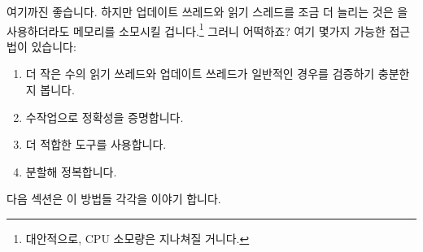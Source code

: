 여기까진 좋습니다.
하지만 업데이트 쓰레드와 읽기 스레드를 조금 더 늘리는 것은  을
사용하더라도 메모리를 소모시킬 겁니다.\footnote{
	대안적으로, CPU 소모량은 지나쳐질 거니다.}
그러니 어떡하죠?
여기 몇가지 가능한 접근법이 있습니다:

\iffalse

For reference, Table~\ref{tab:formal:promela:QRCU Spin Result Summary}
summarizes the Spin results with \co{-DCOLLAPSE} and \co{-DMA=N}
compiler flags.
The memory usage is obtained with minimal sufficient
search depths and \co{-DMA=N} parameters shown in the table.
Hashtable sizes for \co{-DCOLLAPSE} runs are tweaked by
the \co{-wN} option of \co{./pan} to avoid using too much
memory hashing small state spaces.
Hence the memory usage is smaller than what is shown in
Table~\ref{tab:advsync:Memory Usage of QRCU Model}, where the
hashtable size starts from the default of \co{-w24}.
The runtime is from a \Power{9} server, which shows that \co{-DMA=N}
suffers up to about an order of magnitude higher CPU overhead
than does \co{-DCOLLAPSE}, but on the other hand reduces memory overhead
by well over an order of magnitude.

So far so good.
But adding a few more updaters or readers would exhaust memory, even
with \co{-DMA=N}.\footnote{
	Alternatively, the CPU consumption would become excessive.}
So what to do?
Here are some possible approaches:

\fi

\begin{enumerate}
\item	더 작은 수의 읽기 쓰레드와 업데이트 쓰레드가 일반적인 경우를 검증하기
	충분한지 봅니다.
\item	수작업으로 정확성을 증명합니다.
\item	더 적합한 도구를 사용합니다.
\item	분할해 정복합니다.

\iffalse

\item	See whether a smaller number of readers and updaters suffice
	to prove the general case.
\item	Manually construct a proof of correctness.
\item	Use a more capable tool.
\item	Divide and conquer.

\fi

\end{enumerate}

다음 섹션은 이 방법들 각각을 이야기 합니다.


